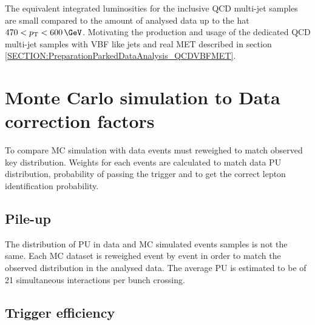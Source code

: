 The equivalent integrated luminosities for the inclusive \gls{QCD} multi-jet samples are small compared to the amount of analysed data up to the \pt hat $470<\pt<600\,\GeV$. Motivating the production and usage of the dedicated \gls{QCD} multi-jet samples with \gls{VBF} like jets and real \gls{MET} described in section \ref{SECTION:PreparationParkedDataAnalysis_QCDVBFMET}.

\clearpage

\section{Monte Carlo simulation to Data correction factors}


To compare \gls{MC} simulation with data events must reweighed to match observed key distribution. Weights for each events are calculated to match data \gls{PU} distribution, probability of passing the trigger and to get the correct lepton identification probability.

\subsection{Pile-up}


The distribution of \gls{PU} in data and \gls{MC} simulated events samples is not the same. Each \gls{MC} dataset is reweighed event by event in order to match the observed distribution in the analysed data. The average \gls{PU} is estimated to be of 21 simultaneous interactions per bunch crossing. 

\subsection{Trigger efficiency}
\label{SUBSECTION:ParkedDataAnalysis_CorrectionFactors_TriggerEfficiency}


